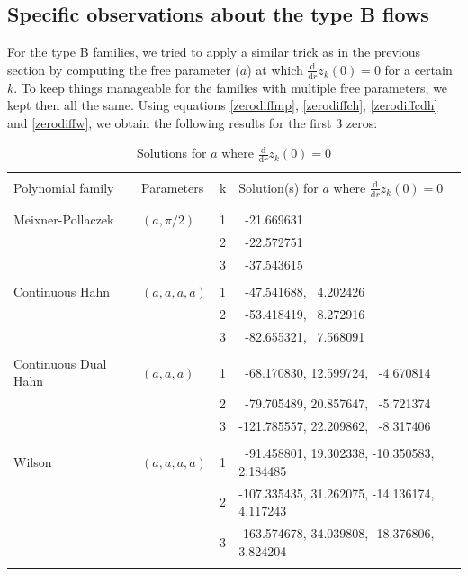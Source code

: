 \documentclass[a4paper,11pt,twoside]{amsart}
\begin{document}
\subsection{Specific observations about the type B flows}
For the type B families, we tried to apply a similar trick as in the previous section by computing the free parameter ($a$) at which $\frac{\mathrm{d}}{\mathrm{d} r} z_k(0) = 0$ for a certain $k$. To keep things manageable for the families with multiple free parameters, we kept then all the same. Using equations \ref{zerodiffmp}, \ref{zerodiffch}, \ref{zerodiffcdh} and \ref{zerodiffw}, we obtain the following results for the first 3 zeros:

\small{
\begin{table}[H]
  \begin{center}
    \caption{Solutions for $a$ where $\frac{\mathrm{d}}{\mathrm{d} r} z_k(0) = 0$}
    \label{tab:tablezeros}
    \begin{tabular}{|l|l|c|l|} 
      \hline
       & & &\\
      Polynomial family & Parameters & k & Solution(s) for $a$ where $\frac{\mathrm{d}}{\mathrm{d} r} z_k(0) = 0$ \\
       & & &\\
      \hline
       & & &\\
      Meixner-Pollaczek & $(a, \pi/2)$ & 1 & \,\,\,-21.669631 \\
         &  & 2 & \,\,\,-22.572751 \\
         &  & 3 & \,\,\,-37.543615 \\
       & & &\\
      Continuous Hahn &$(a,a,a,a)$ & 1 & \,\,\,-47.541688, \,\,\,4.202426  \\  
         &  & 2 & \,\,\,-53.418419,  \,\,\,8.272916  \\
         &  & 3 & \,\,\,-82.655321,  \,\,\,7.568091 \\
       & & &\\
      Continuous Dual Hahn &$(a,a,a)$ & 1 & \,\,\,-68.170830, 12.599724, \,\,\,-4.670814\\ 
         &  & 2 & \,\,\,-79.705489, 20.857647, \,\,\,-5.721374 \\
         &  & 3 & -121.785557, 22.209862, \,\,\,-8.317406 \\
       & & &\\
      Wilson &$(a,a,a,a)$ & 1 &\,\,\,-91.458801,   19.302338, -10.350583, 2.184485 \\ 
         &  & 2 & -107.335435,  31.262075, -14.136174, 4.117243 \\
         &  & 3 & -163.574678, 34.039808, -18.376806, 3.824204 \\
       & & &\\
       \hline
    \end{tabular}
  \end{center}
\end{table}
}
\end{document}
